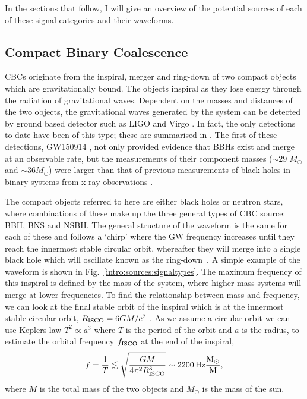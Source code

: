 In the sections that follow, I will give an overview of the potential sources
of each of these signal categories and their waveforms.


\subsection{\label{intro:sources:cbc}Compact Binary Coalescence}

\glspl{CBC} originate from the inspiral, merger and ring-down of two compact
objects which are gravitationally bound.  The objects inspiral as they lose
energy through the radiation of gravitational waves.  Dependent on the masses
and distances of the two objects, the gravitational waves generated by the
system can be detected by ground based detector such as \gls{LIGO}
\citep{aasi2015AdvancedLIGO} and Virgo \citep{acernese2015AdvancedVirgo}.  In
fact, the only detections to date have been of this type; these are summarised
in
\citep{ligoscientificcollaborationandvirgocollaboration2019GWTC1GravitationalWave}.
The first of these detections, GW150914
\citep{abbott2016ObservationGravitational}, not only provided evidence that
\glspl{BBH} exist and merge at an observable rate, but the measurements of
their component masses ($\sim 29\; M_{\odot}$ and $\sim 36 M_{\odot}$) were
larger than that of previous measurements of black holes in binary systems from
x-ray observations \citep{abbott2016ASTROPHYSICALIMPLICATIONS}. 

The compact objects referred to here are either black holes or neutron stars,
where combinations of these make up the three general types of \gls{CBC}
source: \gls{BBH}, \gls{BNS} and \gls{NSBH}.  The general structure of the
waveform is the same for each of these and follows a `chirp' where the \gls{GW}
frequency increases until they reach the innermost stable circular orbit,
whereafter they will merge into a single black hole which will oscillate known
as the ring-down~. A simple example of the waveform is shown in
Fig.~\ref{intro:sources:signaltypes}.  The maximum frequency of this inspiral
is defined by the mass of the system, where higher mass systems will merge at
lower frequencies.  To find the relationship between mass and frequency, we can
look at the final stable orbit of the inspiral which is at the innermost stable
circular orbit, $R_{\rm{ISCO}} = 6GM/c^2$ \citep{maggioreGravitationalWaves}.
As we assume a circular orbit we can use Keplers law $T^2 \propto a^3$ where
$T$ is the period of the orbit and $a$ is the radius, to estimate the orbital
frequency $f_{\rm{ISCO}}$ at the end of the inspiral,
%
\begin{equation}
\label{intro:sources:cbc:freq}
    f = \frac{1}{T} \lesssim \sqrt{\frac{GM}{4 \pi^2 R_{\rm{ISCO}}^3}} \sim 2200 \, \rm{Hz} \frac{M_{\odot}}{M},
\end{equation}
where $M$ is the total mass of the two objects and $M_{\odot}$ is the mass of the sun.


